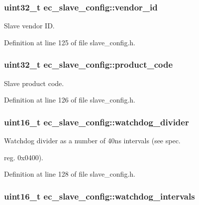 \subsubsection[{vendor\-\_\-id}]{\setlength{\rightskip}{0pt plus 5cm}uint32\-\_\-t ec\-\_\-slave\-\_\-config\-::vendor\-\_\-id}\label{structec__slave__config_ad561239255f4392e34fb12e0327063e0}


Slave vendor I\-D. 



Definition at line 125 of file slave\-\_\-config.\-h.

\subsubsection[{product\-\_\-code}]{\setlength{\rightskip}{0pt plus 5cm}uint32\-\_\-t ec\-\_\-slave\-\_\-config\-::product\-\_\-code}\label{structec__slave__config_a11dfa0af49e66d7b44f2b78d122e1040}


Slave product code. 



Definition at line 126 of file slave\-\_\-config.\-h.

\subsubsection[{watchdog\-\_\-divider}]{\setlength{\rightskip}{0pt plus 5cm}uint16\-\_\-t ec\-\_\-slave\-\_\-config\-::watchdog\-\_\-divider}\label{structec__slave__config_aaa1db6b3136fa60412cbf8d1302c48e9}


Watchdog divider as a number of 40ns intervals (see spec. 

reg. 0x0400). 

Definition at line 128 of file slave\-\_\-config.\-h.

\subsubsection[{watchdog\-\_\-intervals}]{\setlength{\rightskip}{0pt plus 5cm}uint16\-\_\-t ec\-\_\-slave\-\_\-config\-::watchdog\-\_\-intervals}\label{structec__slave__config_a51e0bd197191abd7a46fd3206575eccb}


